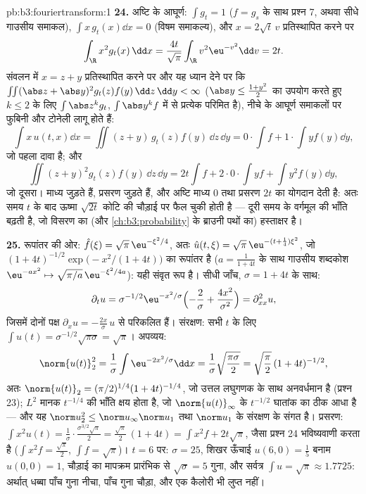 \begin{solution}{pb:b3:fouriertransform:1}
\textbf{24.} अष्टि के आघूर्ण: $\int g_t = 1$ ($f = g_s$ के साथ प्रश्न 7, अथवा
सीधे गाउसीय समाकल), $\int
x\,g_t(x)\dd x = 0$ (विषम समाकल्य), और $x =
2\sqrt t\,v$ प्रतिस्थापित करने
पर
\[
\int_\R x^2g_t(x)\,\dd x
= \frac{4t}{\sqrt\pi}\int_\R v^2\eu^{-v^2}\dd v = 2t .
\]
संवलन में $x = z + y$ प्रतिस्थापित करने पर और यह ध्यान देने पर कि
$\iint(\abs z + \abs y)^2g_t(z)f(y)\,\dd z\,\dd y < \infty$
($\abs y \leq \frac{1 + y^2}2$ का उपयोग करते हुए $k
\leq 2$ के लिए $\int\abs z^kg_t$, $\int\abs y^kf$ में से प्रत्येक
परिमित है), नीचे के आघूर्ण समाकलों पर फुबिनी और टोनेली लागू होते
हैं:
\[
\int x\,u(t,x)\dd x = \iint (z + y)\,g_t(z)f(y)\,\dd z\,\dd
y = 0\cdot\!\int\! f + 1\cdot\!\int\! yf(y)\dd y,
\]
जो पहला दावा है; और
\[
\iint (z+y)^2g_t(z)f(y)\,\dd z\,\dd y
= 2t\int f + 2\cdot0\cdot\!\int\! yf + \int y^2f(y)\dd y ,
\]
जो दूसरा। माध्य जुड़ते हैं, प्रसरण जुड़ते हैं, और अष्टि माध्य $0$
तथा प्रसरण $2t$ का योगदान देती है: अतः समय $t$ के बाद ऊष्मा $\sqrt{2t}$
कोटि की चौड़ाई पर फैल चुकी होती है --- दूरी समय के वर्गमूल की भाँति
बढ़ती है, जो विसरण का (और \cref{ch:b3:probability} के ब्राउनी पथों का) हस्ताक्षर है।

\textbf{25.} रूपांतर की ओर: $\hat f(\xi) =
\sqrt\pi\,\eu^{-\xi^2/4}$, अतः $\hat u(t,\xi) =
\sqrt\pi\,\eu^{-(t + \frac14)\xi^2}$, जो $(1 + 4t)^{-1/2}\exp\bigl(-x^2/(1+4t)\bigr)$ का रूपांतर
है ($a = \frac1{1+4t}$ के साथ गाउसीय शब्दकोश $\eu^{-ax^2} \mapsto
\sqrt{\pi/a}\,\eu^{-\xi^2/4a}$): यही संवृत रूप है। सीधी जाँच,
$\sigma = 1 + 4t$ के साथ:
\[
\partial_tu = \sigma^{-1/2}\eu^{-x^2/\sigma}
\Bigl(-\frac2\sigma + \frac{4x^2}{\sigma^2}\Bigr)
= \partial^2_{xx}u ,
\]
जिसमें दोनों पक्ष $\partial_xu =
-\frac{2x}\sigma\,u$ से परिकलित हैं। संरक्षण: सभी $t$ के लिए
$\int u(t) =
\sigma^{-1/2}\sqrt{\pi\sigma} = \sqrt\pi$। अपव्यय:
\[
\norm{u(t)}_2^2 = \frac1\sigma\int\eu^{-2x^2/\sigma}\dd x
= \frac1\sigma\sqrt{\frac{\pi\sigma}2}
= \sqrt{\frac\pi2}\,(1+4t)^{-1/2},
\]
अतः $\norm{u(t)}_2 = (\pi/2)^{1/4}(1+4t)^{-1/4}$, जो उत्तल लघुगणक के साथ अनवर्धमान है (प्रश्न 23); $L^2$
मानक $t^{-1/4}$ की भाँति क्षय होता है, जो $\norm{u(t)}_\infty$ के $t^{-1/2}$ घातांक का ठीक
आधा है --- और यह $\norm u_2^2 \leq \norm u_\infty\norm u_1$ तथा $\norm u_1$ के संरक्षण के संगत है। प्रसरण:
$\int x^2u(t) =
\frac1\sigma\cdot\frac{\sigma^{3/2}\sqrt\pi}2 =
\frac{\sqrt\pi}2\,(1 + 4t) = \int x^2f + 2t\sqrt\pi$, जैसा प्रश्न 24 भविष्यवाणी करता है ($\int x^2f = \frac{\sqrt\pi}2$, $\int
f = \sqrt\pi$)। $t = 6$ पर:
$\sigma = 25$, शिखर ऊँचाई $u(6, 0) = \frac15$ बनाम $u(0,0) = 1$, चौड़ाई का मापक्रम प्रारंभिक से
$\sqrt\sigma = 5$ गुना, और सर्वत्र $\int u =
\sqrt\pi \approx 1.7725$: अर्थात् धब्बा पाँच गुना नीचा, पाँच
गुना चौड़ा, और एक कैलोरी भी लुप्त नहीं।
\end{solution}

